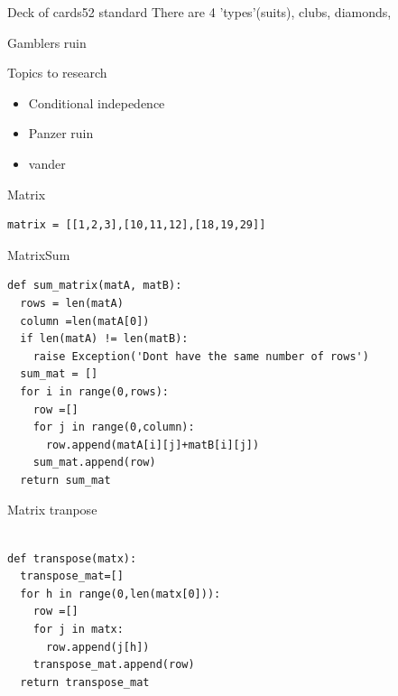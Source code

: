 \documentclass{beamer}
\begin{document}
\begin{frame}{Deck of cards}{52 standard}
There are 4 'types'(suits), clubs, diamonds, 

\end{frame}


\begin{frame}{Gamblers ruin}

\end{frame}







\begin{frame}{Topics to research}
\begin{itemize}
\item Conditional indepedence
\item Panzer ruin
\item vander
\end{itemize}
\end{frame}


\begin{frame}[fragile]{Matrix}
\begin{lstlisting}
matrix = [[1,2,3],[10,11,12],[18,19,29]]
\end{lstlisting}

\end{frame}




\begin{frame}[fragile]{Matrix}{Sum}
\begin{lstlisting}
def sum_matrix(matA, matB):
  rows = len(matA)
  column =len(matA[0])
  if len(matA) != len(matB):
    raise Exception('Dont have the same number of rows')
  sum_mat = []
  for i in range(0,rows):
    row =[]
    for j in range(0,column):
      row.append(matA[i][j]+matB[i][j])
    sum_mat.append(row)
  return sum_mat
\end{lstlisting}
\end{frame}




\begin{frame}[fragile]{Matrix tranpose}

\begin{lstlisting}

def transpose(matx):
  transpose_mat=[]
  for h in range(0,len(matx[0])):
    row =[]
    for j in matx:
      row.append(j[h])
    transpose_mat.append(row)
  return transpose_mat
\end{lstlisting}
\end{frame}
\end{document}
